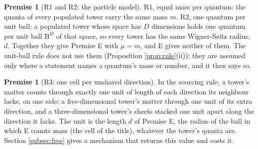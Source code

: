 \documentclass[11pt]{article}
\theoremstyle{definition}
\newtheorem{premise}[theorem]{Premise}
\newcommand{\B}{\mathrm{B}}
\begin{document}
\begin{premise}[R1 and R2: the particle model]\label{prem:R1}\label{prem:R2}
R1, equal mass per quantum: the quanta of every populated tower carry the same mass $m$. R2, one quantum per unit ball: a populated tower whose space has $D$ dimensions holds one quantum per unit ball $\B^{D}$ of that space, so every tower has the same Wigner-Seitz radius, $d$. Together they give Premise E with $\mu = m$, and E gives neither of them. The unit-ball rule does not use them (Proposition \ref{prop:rule}(ii)); they are assumed only where a statement names a quantum's mass or number, and it then says so.
\end{premise}

\begin{premise}[R3: one cell per unshared direction]\label{prem:R3}
In the sourcing rule, a tower's matter counts through exactly one unit of length of each direction its neighbour lacks, on one side: a five-dimensional tower's matter through one unit of its extra direction, and a three-dimensional tower's sheets stacked one unit apart along the direction it lacks. The unit is the length $d$ of Premise E, the radius of the ball in which E counts mass (the cell of the title), whatever the tower's quanta are. Section \ref{subsec:free} gives a mechanism that returns this value and costs it.
\end{premise}
\end{document}
